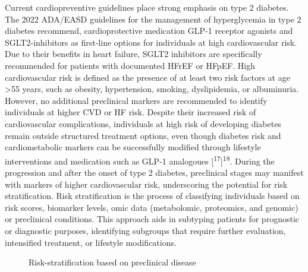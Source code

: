 \documentclass[
  a4paper,
  headsepline=true,
  open=any]{scrbook}
\begin{document}
Current cardiopreventive guidelines place strong emphasis on type 2
diabetes. The 2022 ADA/EASD guidelines for the management of
hyperglycemia in type 2 diabetes recommend, cardioprotective medication
GLP-1 receptor agonists and SGLT2-inhibitors as first-line options for
individuals at high cardiovascular risk. Due to their benefits in heart
failure, SGLT2 inhibitors are specifically recommended for patients with
documented HFrEF or HFpEF. High cardiovascular risk is defined as the
presence of at least two risk factors at age \textgreater55 years, such
as obesity, hypertension, smoking, dyslipidemia, or albuminuria.
However, no additional preclinical markers are recommended to identify
individuals at higher CVD or HF risk. Despite their increased risk of
cardiovascular complications, individuals at high risk of developing
diabetes remain outside structured treatment options, even though
diabetes risk and cardiometabolic markers can be successfully modified
through lifestyle interventions and medication such as GLP-1 analogoues
{[}\textsuperscript{17}{]}\textsuperscript{18}. During the progression
and after the onset of type 2 diabetes, preclinical stages may manifest
with markers of higher cardiovascular risk, underscoring the potential
for risk stratification. Risk stratification is the process of
classifying individuals based on risk scores, biomarker levels, omic
data (metabolomic, proteomics, and genomic) or preclinical conditions.
This approach aids in subtyping patients for prognostic or diagnostic
purposes, identifying subgroups that require further evaluation,
intensified treatment, or lifestyle modifications.

\begin{figure}

\begin{minipage}[t]{\linewidth}

{\centering 


\caption{Risk-stratification based on preclinical disease}

}

\end{minipage}%

\end{figure}
\end{document}
